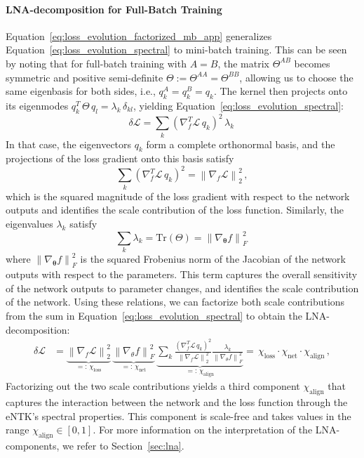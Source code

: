 \paragraph{LNA-decomposition for Full-Batch Training}
Equation~\ref{eq:loss_evolution_factorized_mb_app} generalizes Equation~\ref{eq:loss_evolution_spectral} to mini-batch training. This can be seen by noting that for full-batch training with \(A = B\), the matrix \(\Theta^{A B}\) becomes symmetric and positive semi-definite \(\Theta :=\Theta^{AA} = \Theta^{BB}\), allowing us to choose the same eigenbasis for both sides, i.e., \(q_k^A = q_k^B = q_k\).
The kernel then projects onto its eigenmodes \( q_k^T \, \Theta \, q_l = \lambda_k \, \delta_{k l} \), yielding Equation~\ref{eq:loss_evolution_spectral}:
\begin{equation}
    \delta \mathcal{L}
    = \sum_{k} (\nabla_f^T \mathcal{L} \, q_k)^2 \, \lambda_k \, 
\end{equation}
In that case, the eigenvectors \(q_k\) form a complete orthonormal basis, and the projections of the loss gradient onto this basis satisfy
\begin{equation}
    \sum_{k} (\nabla_f^T \mathcal{L} \, q_k)^2 = \left\| \nabla_f \mathcal{L} \right\|_2^2 \, ,
\end{equation}
which is the squared magnitude of the loss gradient with respect to the network outputs and identifies the scale contribution of the loss function. 
Similarly, the eigenvalues \(\lambda_k\) satisfy
\begin{equation}
    \sum_{k} \lambda_k = \text{Tr}(\Theta) = \left\| \nabla_{\boldsymbol{\theta}} f \right\|_F^2 \, 
\end{equation}
where \(\left\| \nabla_{\boldsymbol{\theta}} f \right\|_F^2\) is the squared Frobenius norm of the Jacobian of the network outputs with respect to the parameters.
This term captures the overall sensitivity of the network outputs to parameter changes, and identifies the scale contribution of the network.
Using these relations, we can factorize both scale contributions from the sum in Equation~\ref{eq:loss_evolution_spectral} to obtain the LNA-decomposition:
\begin{align}
    \delta \mathcal{L}
    &=\underbrace{\left\| \nabla_f \mathcal{L} \right\|_2^2 }_{=: \, \chi_{\text{loss}}} \,
    \underbrace{\left\| \nabla_\theta f \right\|_F^2}_{=: \, \chi_{\text{net}}} \,
    \underbrace{\sum_{k} \frac{ (\nabla_f^T \mathcal{L} \, q_k)^2 }{\left\| \nabla_f \mathcal{L} \right\|_2^2} \frac{\lambda_k}{\left\| \nabla_\theta f \right\|_F^2}}_{=: \, \chi_{\text{align}}} 
    = \, \chi_{\text{loss}} \cdot \chi_{\text{net}} \cdot \chi_{\text{align}} \, ,
    \label{eq:loss_evolution_factorized_app}
\end{align}
Factorizing out the two scale contributions yields a third component \(\chi_{\text{align}}\) that captures the interaction between the network and the loss function through the eNTK's spectral properties.
This component is scale-free and takes values in the range \(\chi_{\text{align}} \in [0, 1]\). 
For more information on the interpretation of the LNA-components, we refer to Section~\ref{sec:lna}.


